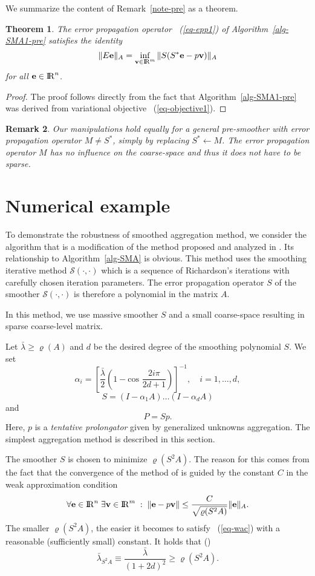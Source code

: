 \documentclass[twoside, 12pt]{article}
\newtheorem{theorem}{Theorem}
\newtheorem{theorem}{Theorem}[section]
\renewcommand{\Re}{{\rm I\negthinspace R}}
\newcommand{\vc}[1]{{\bf #1}} 			%
\newcommand{\eq}[1]{\begin{equation}\label{eq-#1}}
\newcommand{\qe}{\end{equation}}
\newcommand{\eqr}[1]{~(\ref{eq-#1})}        %
\newtheorem{notenote}[theorem]{Remark}
\newenvironment{note}{\begin{notenote}\rm}{\end{notenote}}
\begin{document}
We summarize the content of Remark~\ref{note-pre} as a theorem.
\begin{theorem}
The error propagation operator \eqr{epp1} of Algorithm~\ref{alg-SMA1-pre}
satisfies the identity
$$
      \|E\vc{e}\|_A = \inf_{\vc{v} \in \Re^m} \|S(S^*\vc{e}-p\vc{v})\|_A
$$
for all $\vc{e} \in \Re^n$.
\end{theorem}
\begin{proof}
The proof follows directly from the fact that Algorithm~\ref{alg-SMA1-pre}
was derived from variational objective \eqr{objective1}.
\end{proof}

\begin{note}
Our manipulations hold equally for a general pre-smoother with error
propagation operator $M \neq S^*$, simply by replacing $S^* \leftarrow M$.
The error propagation operator $M$ has no influence on the coarse-space
and thus it does not have to be sparse.
\end{note}

\section{Numerical example}
To demonstrate the robustness of smoothed aggregation method,
we consider the algorithm that is a modification of
the method proposed and analyzed in \cite{VBT}.
Its relationship to Algorithm~\ref{alg-SMA} is obvious.
This method uses the smoothing iterative method ${\mathcal S}(\cdot,\cdot)$
which is a sequence of Richardson's iterations with carefully chosen
iteration parameters. The error propagation
operator $S$ of the smoother ${\mathcal S}(\cdot,\cdot)$
is therefore a polynomial in the matrix $A$.

In this method, we use massive smoother $S$ and a small coarse-space
resulting in sparse coarse-level matrix.

Let ${\bar \lambda} \geq \varrho(A)$ and $d$ be the desired
degree of the smoothing polynomial $S$. We set
\eq{alpha_i}
     \alpha_i = \left[\frac{{\bar \lambda}}{2}
                     \left(1-\mbox{cos~}\frac{2i \pi}{2d+1} \right)
                \right]^{-1},
     \quad i=1, \ldots, d,
\qe
\eq{S}
   S=\left(I-\alpha_1 A\right) \ldots
     \left(I-\alpha_d A\right)
\qe
and
$$
   P=Sp.
$$
Here, $p$ is a {\em tentative prolongator} given by generalized
unknowns aggregation.
The simplest aggregation method is described in this section.

The smoother $S$ is chosen to minimize $\varrho(S^2A)$. The reason for
this comes from the fact that the convergence of the method of \cite{VBT}
is guided by the constant $C$ in the weak approximation condition
\eq{wac}
     \forall \vc{e} \in \Re^n \; \exists \vc{v} \in \Re^m \;:\;
     \|\vc{e} - p\vc{v}\| \leq \frac{C}{\sqrt{\varrho(S^2A)}}\|\vc{e}\|_A.
\qe
The smaller $\varrho(S^2A)$, the easier it becomes to satisfy \eqr{wac} with
a reasonable (sufficiently small) constant.
It holds that (\cite{VBT})
\eq{lambda-S^2A}
       {\bar \lambda}_{S^2A} \equiv \frac{{\bar \lambda}}{(1+2d)^2} \geq
       \varrho(S^2A).
\qe
\end{document}
